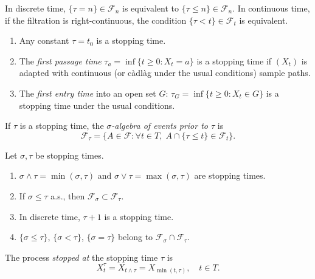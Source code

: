 \begin{remark}
In discrete time, $\{\tau = n\} \in \mathcal{F}_n$ is equivalent to
$\{\tau \leq n\} \in \mathcal{F}_n$. In continuous time, if the filtration is
right-continuous, the condition $\{\tau < t\} \in \mathcal{F}_t$ is equivalent.
\end{remark}

\begin{example}
\begin{enumerate}
  \item Any constant $\tau = t_0$ is a stopping time.
  \item The \emph{first passage time} $\tau_a = \inf\{t \geq 0 : X_t = a\}$
    is a stopping time if $(X_t)$ is adapted with continuous (or c\`adl\`ag under
    the usual conditions) sample paths.
  \item The \emph{first entry time} into an open set $G$:
    $\tau_G = \inf\{t \geq 0 : X_t \in G\}$ is a stopping time under the
    usual conditions.
\end{enumerate}
\end{example}

\begin{definition}
\label{def:stopped_sigma}
If $\tau$ is a stopping time, the \emph{$\sigma$-algebra of events prior to
$\tau$} is
\[
  \mathcal{F}_{\tau} = \{A \in \mathcal{F} : \forall t \in T,\;
  A \cap \{\tau \leq t\} \in \mathcal{F}_t\}.
\]
\end{definition}

\begin{proposition}
Let $\sigma, \tau$ be stopping times.
\begin{enumerate}
  \item $\sigma \wedge \tau = \min(\sigma, \tau)$ and
    $\sigma \vee \tau = \max(\sigma, \tau)$ are stopping times.
  \item If $\sigma \leq \tau$ a.s., then $\mathcal{F}_{\sigma} \subset \mathcal{F}_{\tau}$.
  \item In discrete time, $\tau + 1$ is a stopping time.
  \item $\{\sigma \leq \tau\}$, $\{\sigma < \tau\}$, $\{\sigma = \tau\}$ belong
    to $\mathcal{F}_{\sigma} \cap \mathcal{F}_{\tau}$.
\end{enumerate}
\end{proposition}

\begin{definition}
The process \emph{stopped at} the stopping time $\tau$ is
\[
  X_t^{\tau} = X_{t \wedge \tau} = X_{\min(t, \tau)}, \quad t \in T.
\]
\end{definition}

